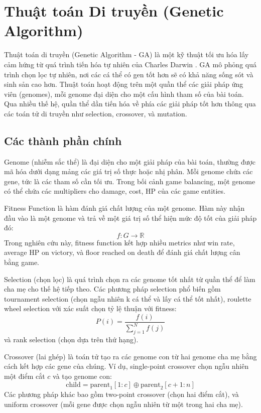 \section{Thuật toán Di truyền (Genetic Algorithm)}

Thuật toán di truyền (Genetic Algorithm - GA) là một kỹ thuật tối ưu hóa lấy cảm hứng từ quá trình tiến hóa tự nhiên của Charles Darwin \cite{holland1992adaptation}. GA mô phỏng quá trình chọn lọc tự nhiên, nơi các cá thể có gen tốt hơn sẽ có khả năng sống sót và sinh sản cao hơn. Thuật toán hoạt động trên một quần thể các giải pháp ứng viên (genomes), mỗi genome đại diện cho một cấu hình tham số của bài toán. Qua nhiều thế hệ, quần thể dần tiến hóa về phía các giải pháp tốt hơn thông qua các toán tử di truyền như selection, crossover, và mutation.

\subsection{Các thành phần chính}

Genome (nhiễm sắc thể) là đại diện cho một giải pháp của bài toán, thường được mã hóa dưới dạng mảng các giá trị số thực hoặc nhị phân. Mỗi genome chứa các gene, tức là các tham số cần tối ưu. Trong bối cảnh game balancing, một genome có thể chứa các multipliers cho damage, cost, HP của các game entities.

Fitness Function là hàm đánh giá chất lượng của một genome. Hàm này nhận đầu vào là một genome và trả về một giá trị số thể hiện mức độ tốt của giải pháp đó:
\begin{equation}
f: G \rightarrow \mathbb{R}
\end{equation}
Trong nghiên cứu này, fitness function kết hợp nhiều metrics như win rate, average HP on victory, và floor reached on death để đánh giá chất lượng cân bằng game.

Selection (chọn lọc) là quá trình chọn ra các genome tốt nhất từ quần thể để làm cha mẹ cho thế hệ tiếp theo. Các phương pháp selection phổ biến gồm tournament selection (chọn ngẫu nhiên k cá thể và lấy cá thể tốt nhất), roulette wheel selection với xác suất chọn tỷ lệ thuận với fitness:
\begin{equation}
P(i) = \frac{f(i)}{\sum_{j=1}^{N} f(j)}
\end{equation}
và rank selection (chọn dựa trên thứ hạng).

Crossover (lai ghép) là toán tử tạo ra các genome con từ hai genome cha mẹ bằng cách kết hợp các gene của chúng. Ví dụ, single-point crossover chọn ngẫu nhiên một điểm cắt $c$ và tạo genome con:
\begin{equation}
\text{child} = \text{parent}_1[1:c] \oplus \text{parent}_2[c+1:n]
\end{equation}
Các phương pháp khác bao gồm two-point crossover (chọn hai điểm cắt), và uniform crossover (mỗi gene được chọn ngẫu nhiên từ một trong hai cha mẹ).

